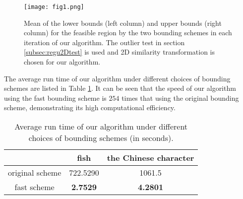 \documentclass[11pt,bezier,]{article}
\begin{document}
\begin{figure}[t]
\texttt{[image: fig1.png]}
% 
% 


\caption{
Mean of the lower bounds (left column) and upper bounds (right column) for the feasible region by the two bounding schemes
in each iteration of our algorithm.
The outlier test in section \ref{subsec:regu2Dtest}  is used
and 2D similarity transformation is chosen for our algorithm.
%
%
\label{two_bounds_compare}
}
\end{figure}







The average run time of our algorithm under different choices of bounding schemes are listed in Table
\ref{bounding_methods_time}. 
It can be seen that the speed of our algorithm using the fast bounding scheme is $254$ times
that using the original bounding scheme, 
demonstrating its high computational efficiency.

\begin{table}[h]
\centering
\caption{
Average run time  of our algorithm under different choices of bounding schemes (in seconds).}
\label{bounding_methods_time}
 \begin{tabular}{|c|c|c|}
\hline
              &fish &the Chinese character \\\hline
original scheme &  722.5290  & 1061.5   \\\hline
fast scheme     & \textbf{2.7529} &\textbf{4.2801}    \\\hline
\end{tabular} 
\end{table}
\end{document}
